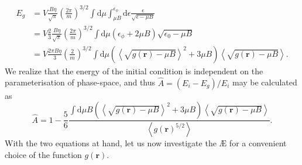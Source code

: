 \begin{equation}
\begin{aligned}
    E_g &= V \frac{B \eta}{\sqrt{\pi}} \left(\frac{2 \pi}{m}\right)^{3/2} \int \mathrm{d}\mu \int_{\mu B}^{\epsilon_\phi}\mathrm{d}\epsilon \frac{ \epsilon}{ \sqrt{\epsilon - \mu B}}  \\ 
    &= V \frac{2}{3}  \frac{B\eta}{\sqrt{\pi}} \left(\frac{2 \pi}{m}\right)^{3/2} \int \mathrm{d}\mu (\epsilon_\phi + 2 \mu B) \sqrt{\epsilon_0 - \mu B} \\
    &= V \frac{2\pi B\eta}{3}  \left(\frac{2 }{m}\right)^{3/2} \int \mathrm{d}\mu \left(\left\langle \sqrt{ g(\boldsymbol{r}) - \mu B} \right\rangle^2 + 3 \mu B \right) \left\langle \sqrt{ g(\boldsymbol{r}) - \mu B} \right\rangle.
\end{aligned}
\end{equation}
We realize that the energy of the initial condition is independent on the parameterisation of phase-space, and thus $\widehat{A}=(E_i -E_g)/E_i$ may be calculated as
\begin{equation}
    \widehat{A} = 1 - \frac{ 5 }{6}\frac{ \int \mathrm{d}\mu B \left(\left\langle \sqrt{ g(\boldsymbol{r}) - \mu B} \right\rangle^2 + 3 \mu B \right) \left\langle \sqrt{ g(\boldsymbol{r}) - \mu B} \right\rangle}{\left\langle g(\boldsymbol{r})^{5/2} \right\rangle}.
    \label{eq: ae constraints}
\end{equation}
With the two equations at hand, let us now investigate the \AE{} for a convenient choice of the function $g(\boldsymbol{r})$.

